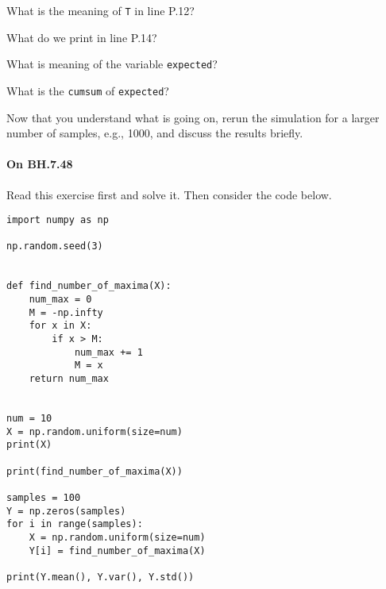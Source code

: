 \documentclass[assignments]{subfiles}
\begin{document}
\begin{exercise}
What is the meaning of \texttt{T} in line P.12?
\begin{solution}
\end{solution}
\end{exercise}


\begin{exercise}
What do we print in line P.14?
\begin{solution}
\end{solution}
\end{exercise}

\begin{exercise}
What is meaning of the variable \texttt{expected}?
\begin{solution}
\end{solution}
\end{exercise}

\begin{exercise}
 What is the \texttt{cumsum} of \texttt{expected}?
\begin{solution}
\end{solution}
\end{exercise}

\begin{exercise}
 Now that you understand what is going on, rerun the simulation for a larger number of samples, e.g., 1000, and discuss the results briefly.
\begin{solution}
\end{solution}
\end{exercise}

\paragraph{On   BH.7.48} Read this exercise first and solve it. Then consider the code below.

\begin{verbatim}
import numpy as np

np.random.seed(3)


def find_number_of_maxima(X):
    num_max = 0
    M = -np.infty
    for x in X:
        if x > M:
            num_max += 1
            M = x
    return num_max


num = 10
X = np.random.uniform(size=num)
print(X)

print(find_number_of_maxima(X))

samples = 100
Y = np.zeros(samples)
for i in range(samples):
    X = np.random.uniform(size=num)
    Y[i] = find_number_of_maxima(X)

print(Y.mean(), Y.var(), Y.std())
\end{verbatim}
\end{document}
